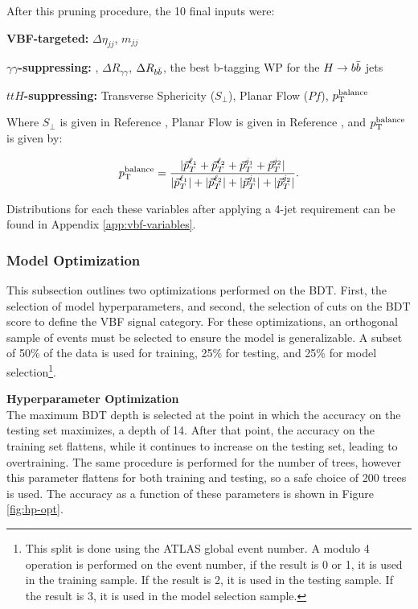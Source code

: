After this pruning procedure, the 10 final inputs were: 

\textbf{VBF-targeted:} $\Delta \eta_{jj}$, $m_{jj}$

\textbf{$\gamma \gamma$-suppressing:} \myybb, $\Delta R_{\gamma\gamma}$, $\Delta R_{b\bar{b}}$, the best b-tagging WP for the $H\rightarrow b\bar{b}$ jets

\textbf{$ttH$-suppressing:} Transverse Sphericity ($S_{\perp}$), Planar Flow ($Pf$), $p_{\text{T}}^\text{balance}$

Where $S_{\perp}$ is given in Reference \cite{STDM-2011-33}, Planar Flow is given in Reference \cite{planar-flow}, and $p_{\text{T}}^\text{balance}$ is given by:

\begin{equation} \label{eqn:pt-balance}
    p_{\text{T}}^\text{balance} = \frac
    {| \vec{p}_T^{\ell_1} + \vec{p}_T^{\ell_2} + \vec{p}_T^{j_1} +  \vec{p}_T^{j_2}|}
    {|\vec{p}_T^{\ell_1}| + |\vec{p}_T^{\ell_2}| + |\vec{p}_T^{j_1}| +  |\vec{p}_T^{j_2}|}.
\end{equation}


Distributions for each these variables after applying a 4-jet requirement can be found in Appendix \ref{app:vbf-variables}. 

\subsubsection{Model Optimization}

This subsection outlines two optimizations performed on the \gls{BDT}. First, the selection of model hyperparameters, and second, the selection of cuts on the \gls{BDT} score to define the \gls{VBF} signal category. For these optimizations, an orthogonal sample of events must be selected to ensure the model is generalizable. A subset of 50\% of the data is used for training, 25\% for testing, and 25\% for model selection\footnote{This split is done using the ATLAS global event number. A modulo 4 operation is performed on the event number, if the result is 0 or 1, it is used in the training sample. If the result is 2, it is used in the testing sample. If the result is 3, it is used in the model selection sample.}.

\noindent\textbf{Hyperparameter Optimization}\\
\indent The maximum \gls{BDT} depth is selected at the point in which the accuracy on the testing set maximizes, a depth of 14. After that point, the accuracy on the training set flattens, while it continues to increase on the testing set, leading to overtraining. The same procedure is performed for the number of trees, however this parameter flattens for both training and testing, so a safe choice of 200 trees is used. The accuracy as a function of these parameters is shown in Figure \ref{fig:hp-opt}.

